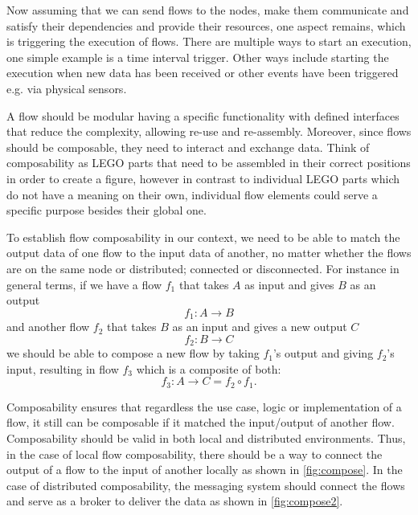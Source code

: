 Now assuming that we can send flows to the nodes, make them communicate and satisfy their dependencies and provide their resources, one aspect remains, which is triggering the execution of flows. There are multiple ways to start an execution, one simple example is a time interval trigger. Other ways include starting the execution when new data has been received or other events have been triggered e.g. via physical sensors.


 A flow should be modular having a specific functionality with defined interfaces that reduce the complexity, allowing re-use and re-assembly. Moreover, since flows should be composable, they need to interact and exchange data. Think of composability as LEGO parts that need to be assembled in their correct positions in order to create a figure, however in contrast to individual LEGO parts which do not have a meaning on their own, individual flow elements could serve a specific purpose besides their global one. 
 
 To establish flow composability in our context, we need to be able to match the output data of one flow to the input data of another, no matter whether the flows are on the same node or distributed; connected or disconnected. For instance in general terms, if we have a flow \(f_1\) that takes \(A\) as input and gives \(B\) as an output
\[ f_1 : A  \to B  \]
and another flow \(f_2\) that takes \(B\) as an input and gives a new output \(C\)
\[ f_2 : B  \to C  \]
we should be able to compose a new flow by taking \(f_1\)'s output and giving \(f_2\)'s input, resulting in flow \(f_3\) which is a composite of both:
\[f_3: A \to C = f_2 \circ f_1 .\]

Composability ensures that regardless the use case, logic or implementation of a flow, it still can be composable if it matched the input/output of another flow. Composability should be valid in both local and distributed environments. Thus, in the case of local flow composability, there should be a way to connect the output of a flow to the input of another locally as shown in \ref{fig:compose}. In the case of distributed composability, the messaging system should connect the flows and serve as a broker to deliver the data as shown in \ref{fig:compose2}. 

